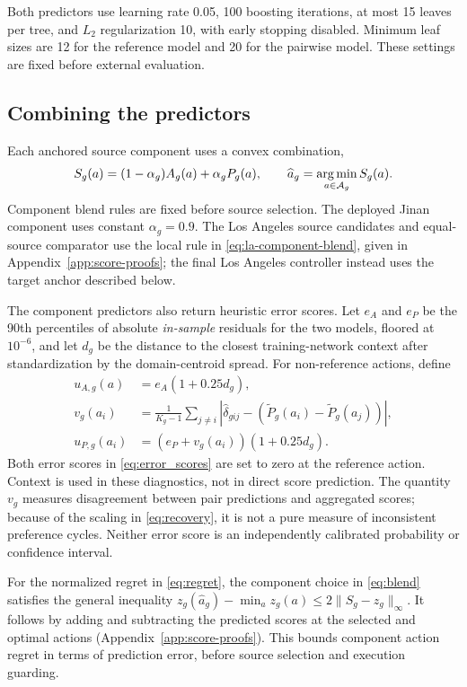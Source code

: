 Both predictors use learning rate 0.05, 100 boosting iterations, at most 15 leaves per tree, and $L_2$ regularization 10, with early stopping disabled. Minimum leaf sizes are 12 for the reference model and 20 for the pairwise model. These settings are fixed before external evaluation.

\subsection{Combining the predictors}
Each anchored source component uses a convex combination,
\begin{equation}
 S_g(a)=(1-\alpha_g)A_g(a)+\alpha_gP_g(a),\qquad
 \widehat a_g=\operatorname*{arg\,min}_{a\in\mathcal A_g}S_g(a).
 \label{eq:blend}
\end{equation}
Component blend rules are fixed before source selection. The deployed Jinan component uses constant $\alpha_g=0.9$. The Los Angeles source candidates and equal-source comparator use the local rule in \eqref{eq:la-component-blend}, given in Appendix~\ref{app:score-proofs}; the final Los Angeles controller instead uses the target anchor described below.

The component predictors also return heuristic error scores. Let $e_A$ and $e_P$ be the 90th percentiles of absolute \emph{in-sample} residuals for the two models, floored at $10^{-6}$, and let $d_g$ be the distance to the closest training-network context after standardization by the domain-centroid spread. For non-reference actions, define
\begin{align}
 u_{A,g}(a)&=e_A(1+0.25d_g),\nonumber\\
 v_g(a_i)&=\frac{1}{K_g-1}\sum_{j\ne i}
 \left|\widehat\delta_{gij}-(\widetilde P_g(a_i)-\widetilde P_g(a_j))\right|,\nonumber\\
 u_{P,g}(a_i)&=(e_P+v_g(a_i))(1+0.25d_g).
 \label{eq:error_scores}
\end{align}
Both error scores in \eqref{eq:error_scores} are set to zero at the reference action. Context is used in these diagnostics, not in direct score prediction. The quantity $v_g$ measures disagreement between pair predictions and aggregated scores; because of the scaling in \eqref{eq:recovery}, it is not a pure measure of inconsistent preference cycles. Neither error score is an independently calibrated probability or confidence interval.

For the normalized regret in \eqref{eq:regret}, the component choice in \eqref{eq:blend} satisfies the general inequality $z_g(\widehat a_g)-\min_a z_g(a)\leq2\|S_g-z_g\|_\infty$. It follows by adding and subtracting the predicted scores at the selected and optimal actions (Appendix~\ref{app:score-proofs}). This bounds component action regret in terms of prediction error, before source selection and execution guarding.

